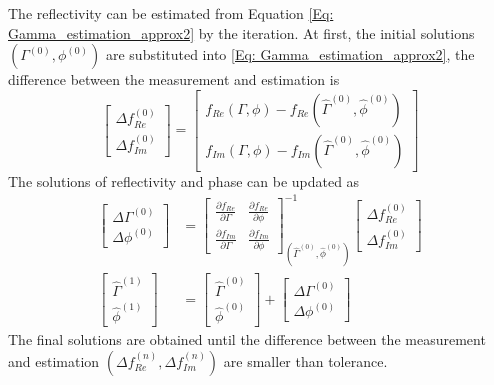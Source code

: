\documentclass[draftcls]{IEEEtran}
\begin{document}
The reflectivity can be estimated from Equation \ref{Eq: Gamma_estimation_approx2} by the iteration. At first, the initial solutions $(\Gamma^{(0)}, \phi^{(0)})$ are substituted into \ref{Eq: Gamma_estimation_approx2}, the difference between the measurement  and estimation is  
\begin{equation}
\begin{bmatrix} \Delta f_{Re}^{(0)} \\ \Delta f_{Im}^{(0)} \end{bmatrix} = 
\begin{bmatrix} f_{Re}(\Gamma, \phi) -  f_{Re}(\hat{\Gamma}^{(0)}, \hat{\phi}^{(0)})\\ f_{Im}(\Gamma, \phi) -  f_{Im}(\hat{\Gamma}^{(0)}, \hat{\phi}^{(0)})\end{bmatrix}
\label{Eq: LSQ1}
\end{equation}
The solutions of reflectivity and phase can be updated as
\begin{align}
 \begin{bmatrix} \Delta \Gamma^{(0)} \\ \Delta \phi^{(0)} \end{bmatrix} &=
 \begin{bmatrix}
        \frac{\partial f_{Re}}{\partial \Gamma}      &  \frac{\partial f_{Re}}{\partial \phi}  \\
        \frac{\partial f_{Im}}{\partial \Gamma}      &  \frac{\partial f_{Im}}{\partial \phi}  
    \end{bmatrix} ^{-1} _{(\hat{\Gamma}^{(0)} ,\hat{\phi}^{(0)})}
    \begin{bmatrix} \Delta f_{Re}^{(0)} \\ \Delta f_{Im}^{(0)} \end{bmatrix} \\
\begin{bmatrix} \hat{\Gamma}^{(1)} \\\hat{\phi}^{(1)} \end{bmatrix}  &= 
\begin{bmatrix} \hat{\Gamma}^{(0)} \\ \hat{\phi}^{(0)} \end{bmatrix}  + \begin{bmatrix} \Delta \Gamma^{(0)} \\ \Delta \phi^{(0)} \end{bmatrix}
\label{Eq: LSQ2}
\end{align}
The final solutions are obtained until  the difference between the measurement  and estimation $(\Delta f_{Re}^{(n)} , \Delta f_{Im}^{(n)}) $  are smaller than tolerance.
\end{document}
